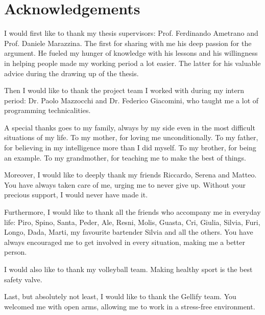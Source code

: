 \chapter{Acknowledgements}
I would first like to thank my thesis supervisors: Prof. Ferdinando Ametrano and Prof. Daniele Marazzina. The first for sharing with me his deep passion for the argument. He fueled my hunger of knowledge with his lessons and his willingness in helping people made my working period a lot easier. The latter for his valuable advice during the drawing up of the thesis.

\bigskip
\noindent
Then I would like to thank the project team I worked with during my intern period: Dr. Paolo Mazzocchi and Dr. Federico Giacomini, who taught me a lot of programming technicalities.

\bigskip
\noindent
A special thanks goes to my family, always by my side even in the most difficult situations of my life. To my mother, for loving me unconditionally. To my father, for believing in my intelligence more than I did myself. To my brother, for being an example. To my grandmother, for teaching me to make the best of things.  

\bigskip
\noindent
Moreover, I would like to deeply thank my friends Riccardo, Serena and Matteo. You have always taken care of me, urging me to never give up. Without your precious support, I would never have made it.

\bigskip
\noindent
Furthermore, I would like to thank all the friends who accompany me in everyday life: Piro, Spino, Santa, Peder, Ale, Resni, Molis, Guasta, Cri, Giulia, Silvia, Furi, Longo, Dada, Marti, my favourite bartender Silvia and all the others. You have always encouraged me to get involved in every situation, making me a better person.

\bigskip
\noindent
I would also like to thank my volleyball team. Making healthy sport is the best safety valve.

\bigskip
\noindent
Last, but absolutely not least, I would like to thank the Gellify team. You welcomed me with open arms, allowing me to work in a stress-free environment.
